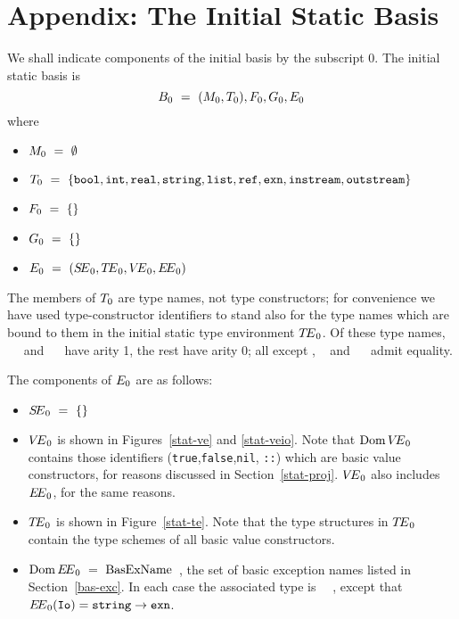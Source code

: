 \section{Appendix: The Initial Static Basis}
\label{init-stat-bas-app}
We shall indicate components of the initial basis by the subscript 0.
The initial static basis is
\[ \B_0\ =\ (\M_0,\T_0),\F_0,\G_0,\E_0\]
where
\begin{itemize}
\item $M_0\ =\ \emptyset$
\item $\T_0\ =\ \{\BOOL,\INT,\REAL,\STRING,\LIST,\REF,\EXCN,\INSTREAM,\OUTSTREAM\}$
\item $F_0\ =\ \{\}$
\item $G_0\ =\ \{\}$
\item $E_0\ =\ (\mbox{$S\!E$}_{0},\mbox{$T\!E$}_{0},\mbox{$V\!E$}_{0},\mbox{$E\!E$}_{0})$
\end{itemize}
The members of $T_0$ are type names, not type constructors; for convenience
we have used type-constructor identifiers
to stand also for the type names which are bound to them in the initial
static type environment $\mbox{$T\!E$}_0$.  Of these type names,
~\LIST~ and ~\REF~
have arity 1, the rest have arity 0;  all except \EXCN, \INSTREAM~ 
and ~\OUTSTREAM~ admit equality.

The components of $E_0$ are as follows:
\begin{itemize}
\item $\mbox{$S\!E$}_0\ =\ \{\}$
\item $\mbox{$V\!E$}_0$ is shown in Figures~\ref{stat-ve} and \ref{stat-veio}. Note that
      $\mathop{\rm Dom}\nolimits\mbox{$V\!E$}_0$  contains those identifiers ({\tt true},{\tt false},{\tt nil},
      \verb+::+) which are basic value constructors,
      for reasons discussed in Section~\ref{stat-proj}. 
      $\mbox{$V\!E$}_0$ also includes $\mbox{$E\!E$}_0$, for the same reasons.
\item $\mbox{$T\!E$}_0$ is shown in Figure~\ref{stat-te}. Note that the type
      structures in $\mbox{$T\!E$}_0$ contain the type schemes of all basic value
      constructors.
\item $\mathop{\rm Dom}\nolimits\mbox{$E\!E$}_0\ =\ {\rm BasExName}$~, the set of basic exception names listed in
Section~\ref{bas-exc}.
In each case the associated type is ~\EXCN~, except that
~$\mbox{$E\!E$}_0({\tt Io})=\mbox{\tt string}\rightarrow\mbox{\tt exn}$.
\end{itemize}

